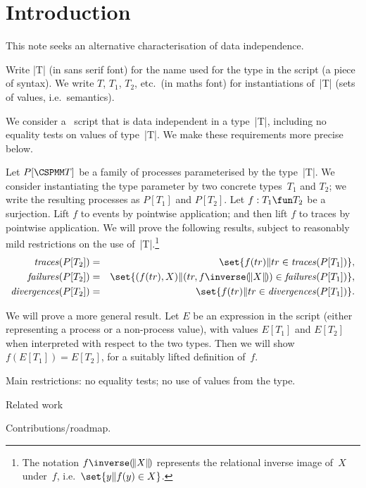 \section{Introduction}

This note seeks an alternative characterisation of data independence.

Write |T| (in sans serif font) for the name used for the type in the script (a
piece of syntax).  We write $T$, $T_1$, $T_2$, etc.\ (in maths font) for
instantiations of~|T| (sets of values, i.e.~semantics). 

We consider a \CSPm\ script that is data independent in a type~|T|, including
no equality tests on values of type~|T|.  We make these requirements more
precise below.

Let $P[\M T]$ be a family of processes parameterised by the type~|T|.  We
consider instantiating the type parameter by two concrete types~$T_1$ and
$T_2$; we write the resulting processes as $P[T_1]$ and $P[T_2]$.  Let $f: T_1
\fun T_2$ be a surjection.  Lift $f$ to events by pointwise application; and
then lift $f$ to traces by pointwise application.  We will prove the following
results, subject to reasonably mild restrictions on the use
of~|T|.\footnote{The notation $f\inverse \banana{X}$ represents the relational
inverse image of~$X$ under~$f$, i.e.~$\set{y \| f(y) \in X}$.}
%
\begin{eqnarray}
\traces(P[T_2]) & = & \set{f(tr) \| tr \in \traces(P[T_1])},
  \label{eqn:traces} \\
\failures(P[T_2]) & = &
  \set{(f(tr), X) \| (tr, f\inverse \banana{X}) \in \failures(P[T_1])},
  \label{eqn:failures} \\
\divergences(P[T_2]) & = & \set{f(tr) \| tr \in \divergences(P[T_1])}.
\label{eqn:fd}
\end{eqnarray}



We will prove a more general result.  Let $E$ be an expression in the script
(either representing a process or a non-process value), with values $E[T_1]$
and $E[T_2]$ when interpreted with respect to the two types.  Then we will
show $f(E[T_1]) = E[T_2]$, for a suitably lifted definition of~$f$.



Main restrictions: no equality tests; no use of values from the type. 

Related work

Contributions/roadmap.
